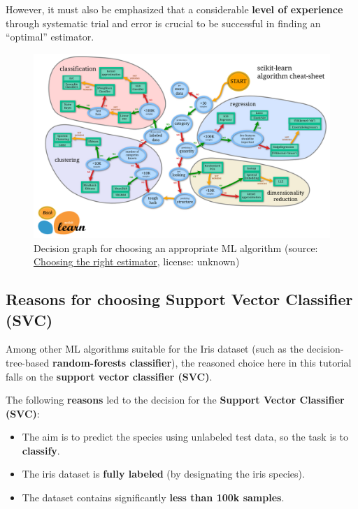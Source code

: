 \documentclass [oneside,10pt,a4paper,ngerman,BCOR10mm,headsepline,parindent,final]{scrartcl}
\providecommand{\tightlist}{%
      \setlength{\itemsep}{0pt}\setlength{\parskip}{0pt}}
\begin{document}
However, it must also be emphasized that a considerable \textbf{level of
experience} through systematic trial and error is crucial to be
successful in finding an ``optimal'' estimator.

    \begin{figure}
\centering
\includegraphics{images/scikit-learn_ml_algorithm_decision.png}
\caption{Decision graph for choosing an appropriate ML algorithm
(source:
\href{https://scikit-learn.org/stable/tutorial/machine_learning_map/index.html}{Choosing
the right estimator}, license: unknown)}
\end{figure}

    \hypertarget{reasons-for-choosing-support-vector-classifier-svc}{%
\subsection{Reasons for choosing Support Vector Classifier
(SVC)}\label{reasons-for-choosing-support-vector-classifier-svc}}

Among other ML algorithms suitable for the Iris dataset (such as the
decision-tree-based \textbf{random-forests classifier}), the reasoned
choice here in this tutorial falls on the \textbf{support vector
classifier (SVC)}.

The following \textbf{reasons} led to the decision for the
\textbf{Support Vector Classifier (SVC)}:

\begin{itemize}
\tightlist
\item
  The aim is to predict the species using unlabeled test data, so the
  task is to \textbf{classify}.
\item
  The iris dataset is \textbf{fully labeled} (by designating the iris
  species).
\item
  The dataset contains significantly \textbf{less than 100k samples}.
\end{itemize}
\end{document}
